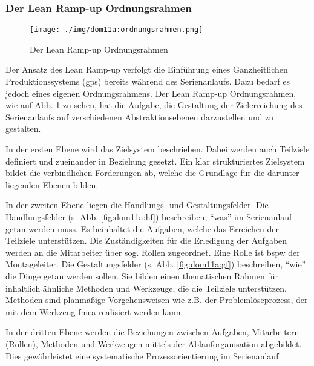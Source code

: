 \subsubsection{Der Lean Ramp-up Ordnungsrahmen}\label{sec:dom11a:ordnungsrahmen}
\begin{figure}[ht]
 \centering
 \texttt{[image: ./img/dom11a:ordnungsrahmen.png]}
 \caption[Der Lean Ramp-up Ordnungsrahmen]{Der Lean Ramp-up Ordnungsrahmen \autocite{Dombrowski2011a}}
 \label{fig:dom11a:ordnungsrahmen}
\end{figure}

Der Ansatz des Lean Ramp-up verfolgt die Einführung eines Ganzheitlichen Produktionssystems (\gls{gps}) bereits während des Serienanlaufs. Dazu bedarf es jedoch eines eigenen Ordnungsrahmens. Der Lean Ramp-up Ordnungsrahmen, wie auf Abb. \ref{fig:dom11a:ordnungsrahmen} zu sehen, hat die Aufgabe, die Gestaltung der Zielerreichung des Serienanlaufs auf verschiedenen Abstraktionsebenen darzustellen und zu gestalten. 

In der ersten Ebene wird das Zielsystem beschrieben. Dabei werden auch Teilziele definiert und zueinander in Beziehung gesetzt. Ein klar strukturiertes Zielsystem bildet die verbindlichen Forderungen ab, welche die Grundlage für die darunter liegenden Ebenen bilden. 

In der zweiten Ebene liegen die Handlungs- und Gestaltungsfelder. Die Handlungsfelder (s. Abb. \ref{fig:dom11a:hf}) beschreiben, ``was'' im Serienanlauf getan werden muss. Es beinhaltet die Aufgaben, welche das Erreichen der Teilziele unterstützen. Die Zuständigkeiten für die Erledigung der Aufgaben werden an die Mitarbeiter über sog. Rollen zugeordnet. Eine Rolle ist \gls{bspw} der Montageleiter. 
Die Gestaltungsfelder (s. Abb. \ref{fig:dom11a:gf}) beschreiben, ``wie'' die Dinge getan werden sollen. Sie bilden einen thematischen Rahmen für inhaltlich ähnliche Methoden und Werkzeuge, die die Teilziele unterstützen. Methoden sind planmäßige Vorgehensweisen wie z.B. der Problemlöseprozess, der mit dem Werkzeug \gls{fmea}
realisiert werden kann.  

In der dritten Ebene werden die Beziehungen zwischen Aufgaben, Mitarbeitern (Rollen), Methoden und Werkzeugen mittels der Ablauforganisation abgebildet. Dies gewährleistet eine systematische Prozessorientierung im Serienanlauf. 


